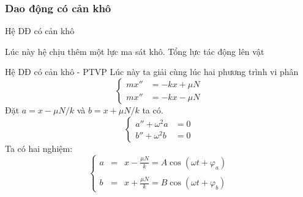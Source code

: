 \subsubsection{Dao động có cản khô}
\begin{frame}{Hệ DĐ có cản khô}
    \begin{center}
        \resizebox{1\linewidth}{!}{}
    \end{center}
    Lúc này hệ chịu thêm một lực ma sát khô. Tổng lực tác động lên vật

\end{frame}
\begin{frame}{Hệ DĐ có cản khô - PTVP}
    Lúc này ta giải cùng lúc hai phương trình vi phân
    \begin{equation}
    \left\{
        \begin{split}
            m x'' &= -kx + \mu N \\
            m x'' &= -kx - \mu N
        \end{split}
    \right.
    \end{equation}
    Đặt \(a=x-\mu N/k\) và \(b=x+\mu N/k\) ta có.
    \begin{equation}
    \left\{
        \begin{split}
        a'' + \omega^2 a &= 0 \\
        b'' + \omega^2 b &= 0
        \end{split}
    \right.
    \end{equation}
    Ta có hai nghiệm:
    \begin{equation}
    \left\{
        \begin{array}{ccc}
        a &=&\displaystyle x -\frac{\mu N}{k} = A \cos{(\omega t + \varphi_a)} 
        \\
        \\
        b &=&\displaystyle x +\frac{\mu N}{k} = B \cos{(\omega t + \varphi_b)}
        \end{array}
    \right.
    \end{equation}
\end{frame}

